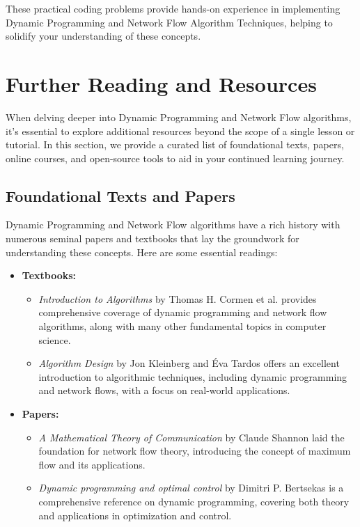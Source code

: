 \documentclass[12pt]{book} %
\begin{document}
These practical coding problems provide hands-on experience in implementing Dynamic Programming and Network Flow Algorithm Techniques, helping to solidify your understanding of these concepts.

\section{Further Reading and Resources}
When delving deeper into Dynamic Programming and Network Flow algorithms, it's essential to explore additional resources beyond the scope of a single lesson or tutorial. In this section, we provide a curated list of foundational texts, papers, online courses, and open-source tools to aid in your continued learning journey.

\subsection{Foundational Texts and Papers}
Dynamic Programming and Network Flow algorithms have a rich history with numerous seminal papers and textbooks that lay the groundwork for understanding these concepts. Here are some essential readings:

\begin{itemize}
    \item \textbf{Textbooks:}
    \begin{itemize}
        \item \textit{Introduction to Algorithms} by Thomas H. Cormen et al. provides comprehensive coverage of dynamic programming and network flow algorithms, along with many other fundamental topics in computer science.
        \item \textit{Algorithm Design} by Jon Kleinberg and Éva Tardos offers an excellent introduction to algorithmic techniques, including dynamic programming and network flows, with a focus on real-world applications.
    \end{itemize}
    \item \textbf{Papers:}
    \begin{itemize}
        \item \textit{A Mathematical Theory of Communication} by Claude Shannon laid the foundation for network flow theory, introducing the concept of maximum flow and its applications.
        \item \textit{Dynamic programming and optimal control} by Dimitri P. Bertsekas is a comprehensive reference on dynamic programming, covering both theory and applications in optimization and control.
    \end{itemize}
\end{itemize}
\end{document}
